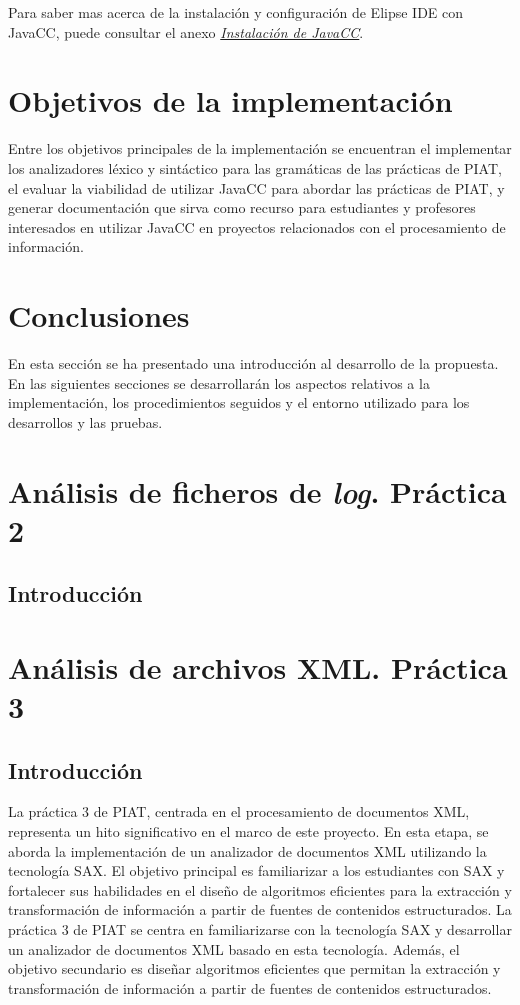 Para saber mas acerca de la instalación y configuración de Elipse IDE con JavaCC, puede consultar el anexo \hyperref[sec:instalaciondejavacc]{\textit{Instalación de JavaCC}}.

\section{Objetivos de la implementación}
Entre los objetivos principales de la implementación se encuentran el implementar los analizadores léxico y sintáctico para las gramáticas de las prácticas de PIAT, el evaluar la viabilidad de utilizar JavaCC para abordar las prácticas de PIAT, y generar documentación que sirva como recurso para estudiantes y profesores interesados en utilizar JavaCC en proyectos relacionados con el procesamiento de información.

\section{Conclusiones}
En esta sección se ha presentado una introducción al desarrollo de la propuesta. En las siguientes secciones se desarrollarán los aspectos relativos a la implementación, los procedimientos seguidos y el entorno utilizado para los desarrollos y las pruebas.

\section{Análisis de ficheros de \textit{log}. Práctica 2}
\subsection{Introducción}

\section{Análisis de archivos XML. Práctica 3}
\subsection{Introducción}

La práctica 3 de PIAT, centrada en el procesamiento de documentos XML, representa un hito significativo en el marco de este proyecto. En esta etapa, se aborda la implementación de un analizador de documentos XML utilizando la tecnología SAX. El objetivo principal es familiarizar a los estudiantes con SAX y fortalecer sus habilidades en el diseño de algoritmos eficientes para la extracción y transformación de información a partir de fuentes de contenidos estructurados.
La práctica 3 de PIAT se centra en familiarizarse con la tecnología SAX y desarrollar un analizador de documentos XML basado en esta tecnología. Además, el objetivo secundario es diseñar algoritmos eficientes que permitan la extracción y transformación de información a partir de fuentes de contenidos estructurados.

